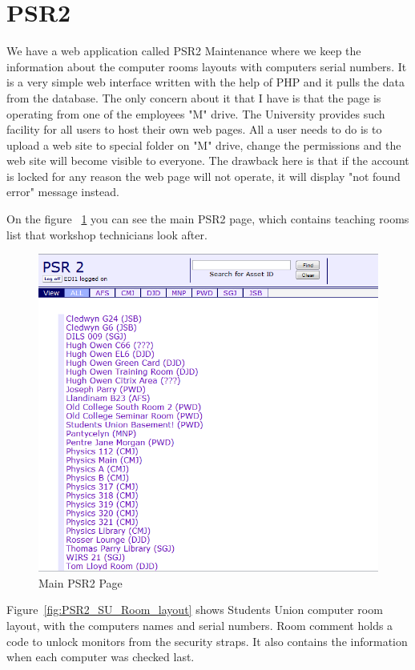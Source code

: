\documentclass[10pt,a4paper,headinclude=true,twoside]{report}
\begin{document}
\section{PSR2}
We have a web application called PSR2 Maintenance where we keep the information about the computer rooms layouts with computers serial numbers. It is a very simple web interface written with the help of PHP and it pulls the data from the database. The only concern about it that I have is that the page is operating from one of the employees "M" drive. The University provides such facility for all users to host their own web pages. All a user needs to do is to upload a web site to special folder on "M" drive, change the permissions and the web site will become visible to everyone. The drawback here is that if the account is locked for any reason the web page will not operate, it will display "not found error" message instead. 

On the figure ~\ref{fig:main_PSR2_page} you can see the main PSR2 page, which contains teaching rooms list that workshop technicians look after.

\begin{figure}[H]
\centering
\centerline{\includegraphics[scale=0.3]{./PSR2}}
\caption{Main PSR2 Page}
\label{fig:main_PSR2_page}
\end{figure}

Figure~\ref{fig:PSR2_SU_Room_layout} shows Students Union computer room layout, with the computers names and serial numbers. Room comment holds a code to unlock monitors from the security straps. It also contains the information when each computer was checked last.
\end{document}
